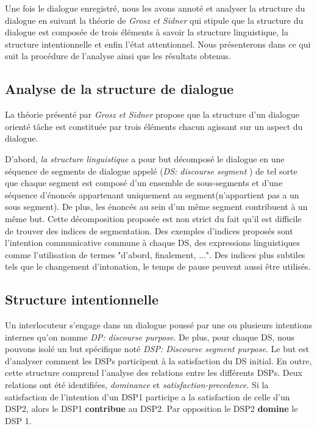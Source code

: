 		Une fois le dialogue enregistré, nous les avons annoté et analyser la structure du dialogue en suivant la théorie de \emph{Grosz et Sidner} \cite{sidner} qui stipule que la structure du dialogue est composée de trois éléments à savoir la structure linguistique, la structure intentionnelle et enfin l'état attentionnel.	
		Nous présenterons dans ce qui suit la procédure de l'analyse ainsi que les résultats obtenus. 
		
		\subsection{Analyse de la structure de dialogue}  
			La théorie présenté par \emph{Grosz et Sidner} propose que la structure d'un dialogue orienté tâche est constituée par trois éléments chacun agissant sur un aspect du dialogue. 
			
			D'abord, \emph{la structure linguistique} a pour but décomposé le dialogue en une séquence de segments de dialogue appelé (\textit{DS: discourse segment }) de tel sorte que chaque segment est composé d'un ensemble de sous-segments et d'une séquence d'énoncés appartenant uniquement au segment(n'appartient pas a un sous segment). De plus, les énoncés au sein d'un même segment contribuent à un même but. Cette décomposition proposée est non strict du fait qu'il est difficile de trouver des indices de segmentation. Des exemples d'indices proposés sont l'intention communicative commune à chaque DS, des expressions  linguistiques comme l'utilisation de termes "d'abord, finalement, $\ldots$". Des indices plus subtiles tels que le changement d'intonation, le temps de pause peuvent aussi être utilisés.
			
		\subsection{Structure intentionnelle}
			Un interlocuteur s'engage dans un dialogue poussé par une ou plusieurs intentions internes qu'on nomme \emph{DP: discourse purpose}. De plus, pour chaque DS, nous pouvons isolé un but spécifique noté \emph{DSP: Discourse segment purpose}. Le but est d'analyser comment les DSPs participent à la satisfaction du DS initial. En outre, cette structure comprend l'analyse des relations entre les différents DSPs. Deux relations ont été identifiées, \emph{dominance} et \emph{satisfaction-precedence}. Si la satisfaction de l'intention d'un DSP1 participe a la satisfaction de celle d'un DSP2, alors le DSP1 \textbf{contribue} au DSP2. Par opposition le DSP2 \textbf{domine} le DSP 1.
	
